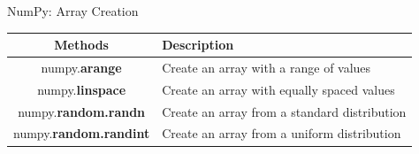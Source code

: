 \documentclass{beamer}
\begin{document}
    \begin{frame}[fragile]{NumPy: Array Creation}
        \begin{example}
            \begin{center}
                \begin{tabular}{ | c | p{6.0cm} |}
                    \hline
                    \textbf{Methods} & \textbf{Description} \\
                    \hline
                    numpy.\textbf{arange} & Create an array with a range of values \\
                    numpy.\textbf{linspace} & Create an array with equally spaced values \\
                    numpy.\textbf{random.randn} & Create an array from a standard distribution \\
                    numpy.\textbf{random.randint} & Create an array from a uniform distribution \\
                    \hline
                \end{tabular}
            \end{center}
        \end{example}
    \end{frame}
\end{document}
